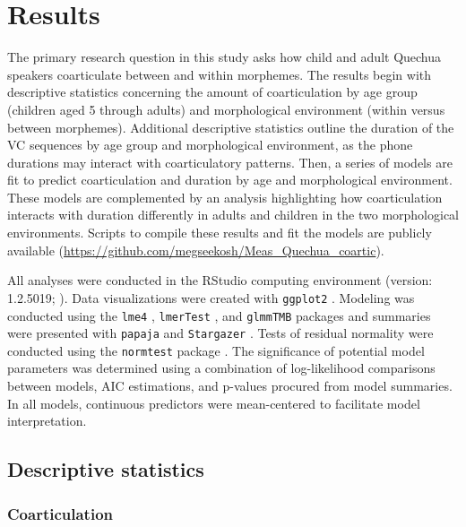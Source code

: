 \documentclass[a4paper,man,floatsintext,natbib,donotrepeattitle, apacite]{apa6}
\begin{document}
\section{Results}

The primary research question in this study asks how child and adult Quechua speakers coarticulate between and within morphemes. The results begin with descriptive statistics concerning the amount of coarticulation by age group (children aged 5 through adults) and morphological environment (within versus between morphemes). Additional descriptive statistics outline the duration of the VC sequences by age group and morphological environment, as the phone durations may interact with coarticulatory patterns. Then, a series of models are fit to predict coarticulation and duration by age and morphological environment. These models are complemented by an analysis highlighting how coarticulation interacts with duration differently in adults and children in the two morphological environments. Scripts to compile these results and fit the models are publicly available (\url{https://github.com/megseekosh/Meas_Quechua_coartic}). 

All analyses were conducted in the RStudio computing environment (version: 1.2.5019; \cite{rstudioteamRStudioIntegratedDevelopment2020}). Data visualizations were created with \texttt{ggplot2} \citep{wickhamGgplot2ElegantGraphics2016}. Modeling was conducted using the \texttt{lme4} \citep{batesFittingLinearMixedeffects2015}, \texttt{lmerTest} \citep{kuznetsovaLmerTestPackageTests2017}, and \texttt{glmmTMB} \citep{brooksGlmmTMBBalancesSpeed2017} packages and summaries were presented with \texttt{papaja} \citep{austPapajaCreateAPA2018} and \texttt{Stargazer} \citep{hlavacStargazerWellFormattedRegression2018}. Tests of residual normality were conducted using the \texttt{normtest} package \citep{gavrilovNormtestTestsNormality2014}. The significance of potential model parameters was determined using a combination of log-likelihood comparisons between models, AIC estimations, and p-values procured from model summaries. In all models, continuous predictors were mean-centered to facilitate model interpretation.


\subsection{Descriptive statistics}\label{descriptive-statistics}


\subsubsection{Coarticulation}\label{coarticulation}
\end{document}
